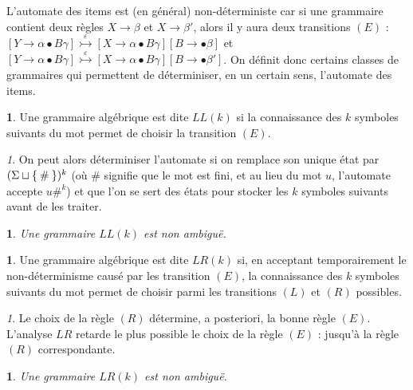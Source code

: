 \documentclass[11pt,a4paper]{article}
\theoremstyle{plain}
\theoremstyle{definition}
\newtheorem{defn}[thm]{\protect\definitionname}
\theoremstyle{definition}
\theoremstyle{remark}
\theoremstyle{remark}
\newtheorem{rem}[thm]{\protect\remarkname}
\theoremstyle{plain}
\theoremstyle{plain}
\newtheorem{prop}[thm]{\protect\propositionname}
\theoremstyle{plain}
\theoremstyle{remark}
\providecommand{\definitionname}{Définition}
\providecommand{\propositionname}{Proposition}
\providecommand{\remarkname}{Remarque}
\begin{document}
L'automate des items est (en général) non-déterministe car si une grammaire contient deux règles $X\to \beta$ et $X\to \beta'$, alors il y aura deux transitions $(E)$ : $\left[Y\to\alpha\bullet B\gamma\right]\overset{\varepsilon}{\rightarrowtail}\left[X\to\alpha\bullet B\gamma\right]\left[B\to\bullet\beta\right]$ et $\left[Y\to\alpha\bullet B\gamma\right]\overset{\varepsilon}{\rightarrowtail}\left[X\to\alpha\bullet B\gamma\right]\left[B\to\bullet\beta'\right]$. On définit donc certains classes de grammaires qui permettent de déterminiser, en un certain sens, l'automate des items.

\begin{defn}
	Une grammaire algébrique est dite \emph{$LL(k)$} si la connaissance des $k$ symboles suivants du mot permet de choisir la transition $(E)$.
\end{defn}

\begin{rem}
	On peut alors déterminiser l'automate si on remplace son unique état par $(\Sigma\sqcup \Set{\#})^k$ (où $\#$ signifie que le mot est fini, et au lieu du mot $u$, l'automate accepte $u\#^k$) et que l'on se sert des états pour stocker les $k$ symboles suivants avant de les traiter.
\end{rem}

\begin{prop}
	Une grammaire $LL(k)$ est non ambiguë.
\end{prop}

\begin{defn}
	Une grammaire algébrique est dite \emph{$LR(k)$} si, en acceptant temporairement le non-déterminisme causé par les transition $(E)$, la connaissance des $k$ symboles suivants du mot permet de choisir parmi les transitions $(L)$ et $(R)$ possibles.
\end{defn}

\begin{rem}
	Le choix de la règle $(R)$ détermine, a posteriori, la bonne règle $(E)$. L'analyse $LR$ retarde le plus possible le choix de la règle $(E)$ : jusqu'à la règle $(R)$ correspondante.
\end{rem}

\begin{prop}
	Une grammaire $LR(k)$ est non ambiguë.
\end{prop}

\newpage
\nocite{*}
\printbibliography
\end{document}
